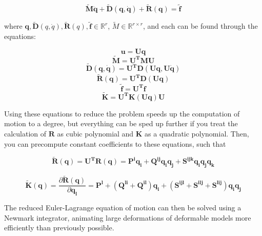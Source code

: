 \documentclass[twocolumn,10pt]{asme2ej}
\begin{document}
\begin{equation}
\bm{\tilde{M}\ddot q} + \bm{\tilde{D}}(\bm{q}, \bm{\dot q}) + \bm{\tilde{R}}(\bm{q}) = \bm{\tilde{f}}
\label{eq_rmotion}
\end{equation}

where $\bm{q}, \bm{\tilde{D}}(q, \dot q), \bm{\tilde{R}}(q), \bm{\tilde{f}} \in \mathbb{R}^{r}$, $\tilde{M} \in \mathbb{R}^{r \times r}$, and each
can be found through the equations:

\begin{equation}
\bm{u} = \bm{Uq}
\label{eq_basisreduction}
\end{equation}
\begin{equation}
\bm{\tilde{M}} = \bm{U^{T}MU}
\label{eq_rmass}
\end{equation}
\begin{equation}
\bm{\tilde{D}}(\bm{q}, \bm{\dot q}) = \bm{U^{T}D}(\bm{Uq}, \bm{U \dot q})
\label{eq_rdamp}
\end{equation}
\begin{equation}
\bm{\tilde{R}}(\bm{q}) = \bm{U^{T}D}(\bm{Uq})
\label{eq_rinternal}
\end{equation}
\begin{equation}
\bm{\tilde{f}} = \bm{U^{T}f}
\label{eq_rexternal}
\end{equation}
\begin{equation}
\bm{\tilde{K}} = \bm{U^{T}K}(\bm{Uq})\bm{U}
\label{eq_rstiffness}
\end{equation}

Using these equations to reduce the problem speeds up the computation of motion to a degree, but everything can be
sped up further if you treat the calculation of $\bm{R}$ as cubic polynomial and $\bm{K}$ as a quadratic polynomial. Then,
you can precompute constant coefficients to these equations, such that

\begin{equation}
\bm{\tilde{R}}(\bm{q}) = \bm{U^{T}R}(\bm{q}) = \bm{P^{i}q_{i}} + \bm{Q^{ij}q_{i}q_{j}} + \bm{S^{ijk}q_{i}q_{j}q_{k}}
\label{eq_rcubicpoly}
\end{equation}

\begin{equation}
\bm{\tilde{K}}(\bm{q}) = \frac{\partial \bm{\tilde{R}}(\bm{q})}{\partial \bm{q_{l}}} = \bm{P^{l}} + (\bm{Q^{li}} + \bm{Q^{il}})\bm{q_{i}} + (\bm{S^{ijl}} + \bm{S^{ilj}} + \bm{S^{lij}} )\bm{q_{i}q_{j}}
\label{eq_rquadpoly}
\end{equation}

The reduced Euler-Lagrange equation of motion can then be solved using a Newmark integrator, animating large deformations
of deformable models more efficiently than previously possible.
\end{document}
